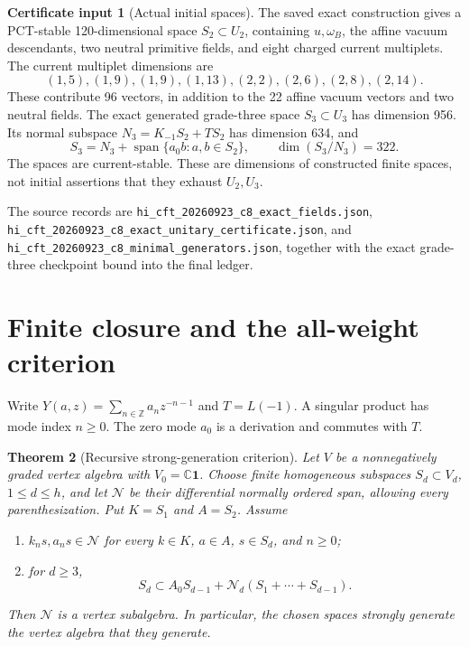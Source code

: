 \documentclass[11pt,a4paper]{article}
\newtheorem{theorem}{Theorem}[section]
\theoremstyle{definition}
\newtheorem{certificate}[theorem]{Certificate input}
\DeclareMathOperator{\Span}{span}
\newcommand{\CC}{\mathbb C}
\newcommand{\ZZ}{\mathbb Z}
\newcommand{\one}{\mathbf1}
\newcommand{\artifact}[1]{\textnormal{\nolinkurl{#1}}}
\begin{document}
\begin{certificate}[Actual initial spaces]\label{cert:initial}
The saved exact construction gives a PCT-stable 120-dimensional
space \(S_2\subset U_2\), containing \(u,\omega_B\), the affine
vacuum descendants, two neutral primitive fields, and eight charged
current multiplets. The current multiplet dimensions are
\[
 (1,5),(1,9),(1,9),(1,13),(2,2),(2,6),(2,8),(2,14).
\]
These contribute 96 vectors, in addition to the 22 affine vacuum
vectors and two neutral fields. The exact generated grade-three
space \(S_3\subset U_3\) has dimension 956. Its normal subspace
\(N_3=K_{-1}S_2+TS_2\) has dimension 634, and
\[
 S_3=N_3+\Span\{a_0b:a,b\in S_2\},\qquad \dim(S_3/N_3)=322.
\]
The spaces are current-stable. These are dimensions of constructed
finite spaces, not initial assertions that they exhaust \(U_2,U_3\).
\end{certificate}
The source records are
\artifact{hi_cft_20260923_c8_exact_fields.json},
\artifact{hi_cft_20260923_c8_exact_unitary_certificate.json}, and
\artifact{hi_cft_20260923_c8_minimal_generators.json}, together with
the exact grade-three checkpoint bound into the final ledger.

\section{Finite closure and the all-weight criterion}\label{sec:finite}
Write \(Y(a,z)=\sum_{n\in\ZZ}a_nz^{-n-1}\) and \(T=L(-1)\).
A singular product has mode index \(n\geq0\). The zero mode \(a_0\)
is a derivation and commutes with \(T\).

\begin{theorem}[Recursive strong-generation criterion]\label{thm:recursive}
Let \(V\) be a nonnegatively graded vertex algebra with \(V_0=\CC\one\).
Choose finite homogeneous subspaces \(S_d\subset V_d\),
\(1\leq d\leq h\), and let \(\mathcal N\) be their differential
normally ordered span, allowing every parenthesization. Put
\(K=S_1\) and \(A=S_2\). Assume
\begin{enumerate}
\item \(k_ns,a_ns\in\mathcal N\) for every \(k\in K\), \(a\in A\),
\(s\in S_d\), and \(n\geq0\);
\item for \(d\geq3\),
\[
 S_d\subset A_0S_{d-1}+\mathcal N_d(S_1+\cdots+S_{d-1}).
\]
\end{enumerate}
Then \(\mathcal N\) is a vertex subalgebra. In particular, the chosen
spaces strongly generate the vertex algebra that they generate.
\end{theorem}
\end{document}
